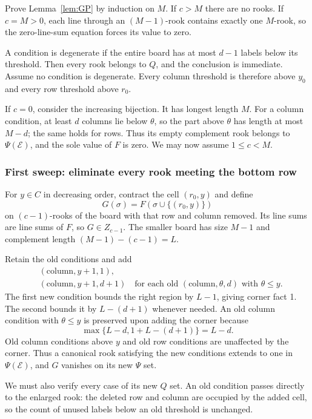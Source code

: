 \documentclass[11pt,a4paper]{article}
\theoremstyle{definition}\newtheorem{definition}[theorem]{Definition}
\theoremstyle{remark}\newtheorem{remark}[theorem]{Remark}
\begin{document}
Prove Lemma~\ref{lem:GP} by induction on $M$. If $c>M$ there are no rooks. If $c=M>0$, each line through an $(M-1)$-rook contains exactly one $M$-rook, so the zero-line-sum equation forces its value to zero.

A condition is degenerate if the entire board has at most $d-1$ labels below its threshold. Then every rook belongs to $Q$, and the conclusion is immediate. Assume no condition is degenerate. Every column threshold is therefore above $y_0$ and every row threshold above $r_0$.

If $c=0$, consider the increasing bijection. It has longest length $M$. For a column condition, at least $d$ columns lie below $\theta$, so the part above $\theta$ has length at most $M-d$; the same holds for rows. Thus its empty complement rook belongs to $\Psi(\mathcal E)$, and the sole value of $F$ is zero. We may now assume $1\le c<M$.

\subsubsection{First sweep: eliminate every rook meeting the bottom row}
For $y\in C$ in decreasing order, contract the cell $(r_0,y)$ and define
\[G(\sigma)=F(\sigma\cup\{(r_0,y)\})
\]
on $(c-1)$-rooks of the board with that row and column removed. Its line sums are line sums of $F$, so $G\in Z_{c-1}$. The smaller board has size $M-1$ and complement length $(M-1)-(c-1)=L$.

Retain the old conditions and add
\begin{align*}
&(\mathrm{column},y+1,1),\\
&(\mathrm{column},y+1,d+1)
\quad\text{for each old }(\mathrm{column},\theta,d)\text{ with }\theta\le y.
\end{align*}
The first new condition bounds the right region by $L-1$, giving corner fact 1. The second bounds it by $L-(d+1)$ whenever needed. An old column condition with $\theta\le y$ is preserved upon adding the corner because
\[\max\{L-d,1+L-(d+1)\}=L-d.
\]
Old column conditions above $y$ and old row conditions are unaffected by the corner. Thus a canonical rook satisfying the new conditions extends to one in $\Psi(\mathcal E)$, and $G$ vanishes on its new $\Psi$ set.

We must also verify every case of its new $Q$ set. An old condition passes directly to the enlarged rook: the deleted row and column are occupied by the added cell, so the count of unused labels below an old threshold is unchanged.
\end{document}
